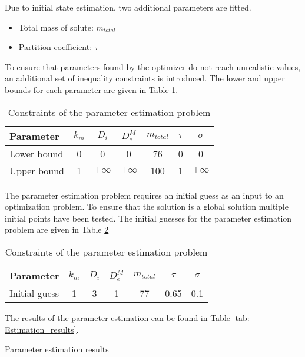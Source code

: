 \documentclass[../Article_Model_Parameters.tex]{subfiles}
\begin{document}
    Due to initial state estimation, two additional parameters are fitted.

    \begin{itemize}
        \item Total mass of solute: \qquad\qquad\quad$m_{total}$
        \item Partition coefficient: \qquad\qquad\quad$\tau$
    \end{itemize}

	To ensure that parameters found by the optimizer do not reach unrealistic values, an additional set of inequality constraints is introduced. The lower and upper bounds for each parameter are given in Table \ref{tab:Constraints}.

	\begin{table}[!h]
		\begin{tabular}{ |l|c|c|c|c|c|c| } 
			\hline
			Parameter	&$k_m$ 	& $D_i$ 	& $D_e^M$ 	& $m_{total}$	& $\tau$ 	& $\sigma$ \\  \hline
			Lower bound	&0	  	& 0 	  	& 0 		& 76 		 	& 0 	   	& 0 \\  \hline
			Upper bound	&1 		& $+\infty$ & $+\infty$	& 100 			& 1 		& $+\infty$ \\
			\hline
		\end{tabular}
	\caption{Constraints of the parameter estimation problem}
	\label{tab:Constraints}
	\end{table}

	The parameter estimation problem requires an initial guess as an input to an optimization problem. To ensure that the solution is a global solution multiple initial points have been tested. The initial guesses for the parameter estimation problem are given in Table \ref{tab:InitialGuess}
	
	\begin{table}[!h]
		\begin{tabular}{ |l|c|c|c|c|c|c| } 
			\hline
			Parameter		&$k_m$ 	& $D_i$ 	& $D_e^M$ 	& $m_{total}$	& $\tau$ 	& $\sigma$ \\  \hline
			Initial guess	&1	  	& 3 	  	& 1 		& 77 		 	& 0.65 	   	& 0.1 \\  
			\hline
		\end{tabular}
		\caption{Constraints of the parameter estimation problem}
		\label{tab:InitialGuess}
	\end{table}

	The results of the parameter estimation can be found in Table \ref{tab: Estimation_results}.
		
	\begin{table}[!h]
		\centering
		\caption{Parameter estimation results}
		\label{tab: Estimation_results}
	\end{table}
	
\end{document}

